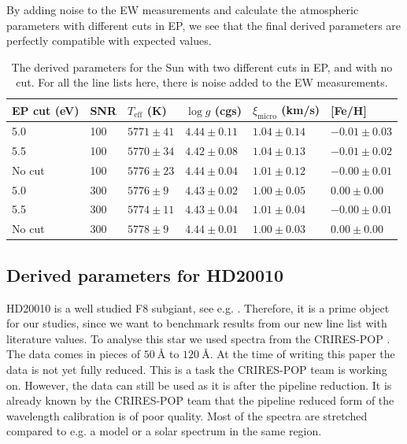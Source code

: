 \documentclass{aa}
\begin{document}
By adding noise to the EW measurements and calculate the atmospheric
parameters with different cuts in EP, we see that the final derived parameters
are perfectly compatible with expected values.





\begin{table}[tb!]
    \caption{The derived parameters for the Sun with two different cuts
    in EP, and with no cut. For all the line lists here, there is noise
    added to the EW measurements.}
    \label{tab:sun}
    \centering
    \begin{tabular}{llllll}
      \hline\hline
        EP cut (eV) &  SNR &  $T_\mathrm{eff}$ (K) &  $\log g$ (cgs)     &  $\xi_\mathrm{micro}$ (km/s) &  [Fe/H]           \\
        \hline
        5.0         &  100 &  $5771 \pm  41$       & $4.44   \pm  0.11$  & $1.04  \pm  0.14$            & $-0.01    \pm 0.03$\\
        5.5         &  100 &  $5770 \pm  34$       & $4.42   \pm  0.08$  & $1.04  \pm  0.13$            & $-0.01    \pm 0.02$\\
        No cut      &  100 &  $5776 \pm  23$       & $4.44   \pm  0.04$  & $1.01  \pm  0.12$            & $-0.00    \pm 0.01$\\
        \hline
        5.0         &  300 &  $5776 \pm  9 $       & $4.43   \pm  0.02$  & $1.00  \pm  0.05$            &  $0.00    \pm 0.00$\\
        5.5         &  300 &  $5774 \pm  11$       & $4.43   \pm  0.04$  & $1.01  \pm  0.04$            & $-0.00    \pm 0.01$\\
        No cut      &  300 &  $5778 \pm  9 $       & $4.44   \pm  0.01$  & $1.00  \pm  0.03$            &  $0.00    \pm 0.00$\\
      \hline
    \end{tabular}
\end{table}




\subsection{Derived parameters for HD20010}
\label{sec:derived_parameters_of_hd20010}

HD20010 is a well studied F8 subgiant, see e.g.
\cite{Mortier2013,Lebzelter2012}. Therefore, it is a prime object for
our studies, since we want to benchmark results from our new line list
with literature values. To analyse this star we used spectra from
the CRIRES-POP \citep{Lebzelter2012}. The data comes in pieces of
$\SI{50}{\angstrom}$ to $\SI{120}{\angstrom}$. At the time of writing
this paper the data is not yet fully reduced. This is a task the
CRIRES-POP team is working on. However, the data can still be used as it
is after the pipeline reduction. It is already known by the CRIRES-POP
team that the pipeline reduced form of the wavelength calibration is of
poor quality. Most of the spectra are stretched compared to e.g. a model
or a solar spectrum in the same region.
\end{document}
